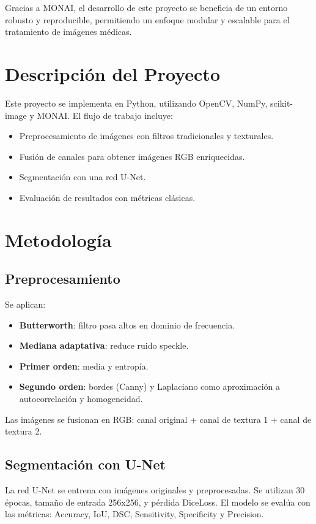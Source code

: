 \documentclass[12pt]{article}
\begin{document}
Gracias a MONAI, el desarrollo de este proyecto se beneficia de un entorno robusto y reproducible, permitiendo un enfoque modular y escalable para el tratamiento de imágenes médicas.

\section{Descripción del Proyecto}
Este proyecto se implementa en Python, utilizando OpenCV, NumPy, scikit-image y MONAI. El flujo de trabajo incluye:
\begin{itemize}
    \item Preprocesamiento de imágenes con filtros tradicionales y texturales.
    \item Fusión de canales para obtener imágenes RGB enriquecidas.
    \item Segmentación con una red U-Net.
    \item Evaluación de resultados con métricas clásicas.
\end{itemize}

\section{Metodología}
\subsection{Preprocesamiento}
Se aplican:
\begin{itemize}
    \item \textbf{Butterworth}: filtro pasa altos en dominio de frecuencia.
    \item \textbf{Mediana adaptativa}: reduce ruido speckle.
    \item \textbf{Primer orden}: media y entropía.
    \item \textbf{Segundo orden}: bordes (Canny) y Laplaciano como aproximación a autocorrelación y homogeneidad.
\end{itemize}

Las imágenes se fusionan en RGB: canal original + canal de textura 1 + canal de textura 2.

\subsection{Segmentación con U-Net}
La red U-Net se entrena con imágenes originales y preprocesadas. Se utilizan 30 épocas, tamaño de entrada 256x256, y pérdida DiceLoss. El modelo se evalúa con las métricas: Accuracy, IoU, DSC, Sensitivity, Specificity y Precision.
\end{document}
